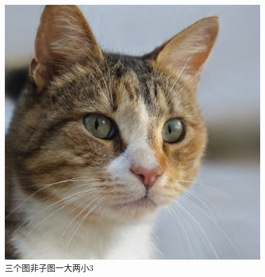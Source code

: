 \documentclass[12pt,a4paper,UTF8]{article}
\begin{document}
\begin{figure}[!htbp]
\begin{minipage}[b]{0.4\textwidth}
\begin{minipage}[b]{\textwidth}
            \end{minipage}\\[0.8cm]%
            \begin{minipage}[b]{\textwidth}
                \centering
                \includegraphics[width=\textwidth]{example}
                \caption{三个图非子图一大两小3}		
                 
            \end{minipage}	
        \end{minipage}
    \end{figure}
\end{document}
